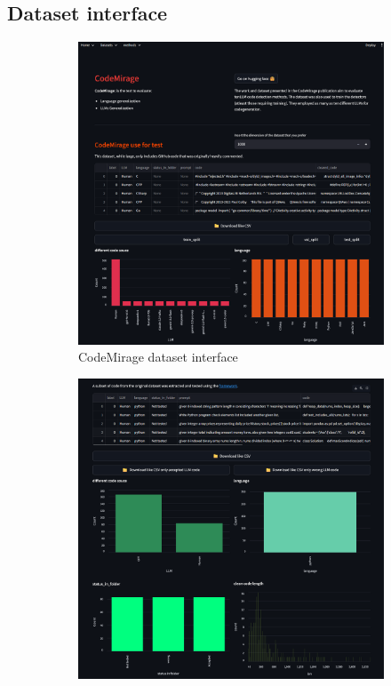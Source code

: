 \subsection{Dataset interface}
\begin{figure}[H]
    \centering
    \begin{subfigure}[t]{0.45\textwidth}
        \centering
        \includegraphics[width=\linewidth]{img/interfaccia/Screenshot 2025-09-27 172512.png}
        \caption{CodeMirage dataset interface}
        \label{fig:errit}
    \end{subfigure}
    \hfill
    \begin{subfigure}[t]{0.45\textwidth}
        \centering
        \includegraphics[width=\linewidth]{img/interfaccia/Screenshot 2025-09-27 172541.png}

\end{subfigure}
\end{figure}
